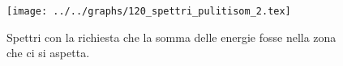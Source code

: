 \begin{figure}[h] \centering\texttt{[image: ../../graphs/120\_spettri\_pulitisom\_2.tex]}\caption{Spettri con la richiesta che la somma delle energie fosse nella zona che ci si aspetta. }\label{gr:120_spettri_pulitisom_2} \end{figure}
